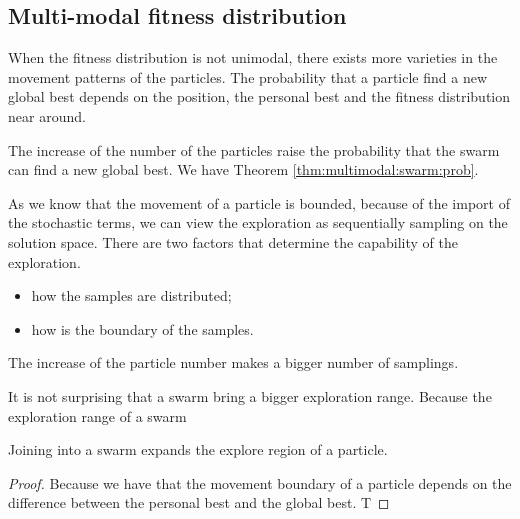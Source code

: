 \subsection{Multi-modal fitness distribution}

When the fitness distribution is not unimodal, there exists more varieties in the movement patterns of the particles.
The probability that a particle find a new global best depends on the position, the personal best and the fitness distribution near around.

The increase of the number of the particles raise the probability that the swarm can find a new global best.
We have Theorem \ref{thm:multimodal:swarm:prob}.

As we know that the movement of a particle is bounded, because of the import of the stochastic terms, we can view the exploration as sequentially sampling on the solution space.
There are two factors that determine the capability of the exploration.
\begin{itemize}
\item how the samples are distributed;
\item how is the boundary of the samples.
\end{itemize}

\begin{myprop}
The increase of the particle number makes a bigger number of samplings.
\end{myprop}

It is not surprising that a swarm bring a bigger exploration range.
Because the exploration range of a swarm 

\begin{mythm}
Joining into a swarm expands the explore region of a particle.
\begin{proof}
Because we have that the movement boundary of a particle depends on the difference between the personal best and the global best.
T
\end{proof}
\end{mythm}

